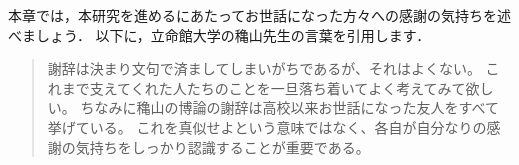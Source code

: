 本章では，本研究を進めるにあたってお世話になった方々への感謝の気持ちを述べましょう．
以下に，立命館大学の穐山先生の言葉を引用します．

\begin{quote}
  謝辞は決まり文句で済ましてしまいがちであるが、それはよくない。
  これまで支えてくれた人たちのことを一旦落ち着いてよく考えてみて欲しい。
  ちなみに穐山の博論の謝辞は高校以来お世話になった友人をすべて挙げている。
  これを真似せよという意味ではなく、各自が自分なりの感謝の気持ちをしっかり認識することが重要である。
\end{quote}